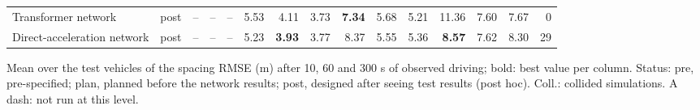 \begin{table}[t]
\begin{tabular}{llrrrrrrrrrrrrr}
Transformer network & post & -- & -- & -- & 5.53 & 4.11 & 3.73 & \textbf{7.34} & 5.68 & 5.21 & 11.36 & 7.60 & 7.67 & 0 \\
Direct-acceleration network & post & -- & -- & -- & 5.23 & \textbf{3.93} & 3.77 & 8.37 & 5.55 & 5.36 & \textbf{8.57} & 7.62 & 8.30 & 29 \\
\bottomrule
\end{tabular}
\par\smallskip
\parbox{\linewidth}{\footnotesize Mean over the test vehicles of the spacing RMSE (m) after 10, 60 and 300 s of observed driving; bold: best value per column. Status: pre, pre-specified; plan, planned before the network results; post, designed after seeing test results (post hoc). Coll.: collided simulations. A dash: not run at this level.}
\end{table}
